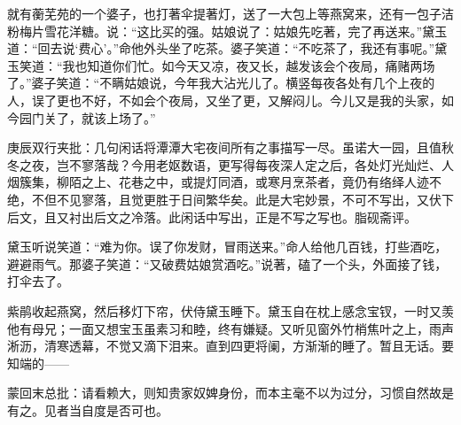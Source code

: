 \begin{parag}
    就有蘅芜苑的一个婆子，也打著伞提著灯，送了一大包上等燕窝来，还有一包子洁粉梅片雪花洋糖。说：“这比买的强。姑娘说了：姑娘先吃著，完了再送来。”黛玉道：“回去说‘费心’。”命他外头坐了吃茶。婆子笑道：“不吃茶了，我还有事呢。”黛玉笑道：“我也知道你们忙。如今天又凉，夜又长，越发该会个夜局，痛赌两场了。”婆子笑道：“不瞒姑娘说，今年我大沾光儿了。横竖每夜各处有几个上夜的人，误了更也不好，不如会个夜局，又坐了更，又解闷儿。今儿又是我的头家，如今园门关了，就该上场了。”\begin{note}庚辰双行夹批：几句闲话将潭潭大宅夜间所有之事描写一尽。虽诺大一园，且值秋冬之夜，岂不寥落哉？今用老妪数语，更写得每夜深人定之后，各处灯光灿烂、人烟簇集，柳陌之上、花巷之中，或提灯同酒，或寒月烹茶者，竟仍有络绎人迹不绝，不但不见寥落，且觉更胜于日间繁华矣。此是大宅妙景，不可不写出，又伏下后文，且又衬出后文之冷落。此闲话中写出，正是不写之写也。脂砚斋评。\end{note}黛玉听说笑道：“难为你。误了你发财，冒雨送来。”命人给他几百钱，打些酒吃，避避雨气。那婆子笑道：“又破费姑娘赏酒吃。”说著，磕了一个头，外面接了钱，打伞去了。
\end{parag}


\begin{parag}
    紫鹃收起燕窝，然后移灯下帘，伏侍黛玉睡下。黛玉自在枕上感念宝钗，一时又羡他有母兄；一面又想宝玉虽素习和睦，终有嫌疑。又听见窗外竹梢焦叶之上，雨声淅沥，清寒透幕，不觉又滴下泪来。直到四更将阑，方渐渐的睡了。暂且无话。要知端的——
\end{parag}


\begin{parag}
    \begin{note}蒙回末总批：请看赖大，则知贵家奴婢身份，而本主毫不以为过分，习惯自然故是有之。见者当自度是否可也。\end{note}
\end{parag}

